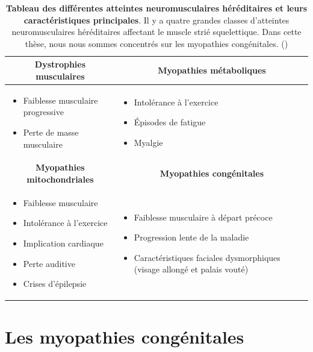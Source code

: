 \begin{table}[htbp]
\centering
\begin{tabularx}{\textwidth}{|X|X|}
 \hline
\multicolumn{1}{|c|}{\textbf{Dystrophies musculaires}} & \multicolumn{1}{|c|}{\textbf{Myopathies métaboliques}} \\
\hline
\begin{itemize}
\item Faiblesse musculaire progressive
\item Perte de masse musculaire
\end{itemize} &
\begin{itemize}
\item Intolérance à l'exercice
\item Épisodes de fatigue
\item Myalgie
\end{itemize} \\
\hline
\multicolumn{1}{|c|}{\textbf{Myopathies mitochondriales}} & \multicolumn{1}{|c|}{\textbf{Myopathies congénitales}} \\
\hline
\begin{itemize}
\item Faiblesse musculaire
\item Intolérance à l'exercice
\item Implication cardiaque
\item Perte auditive
\item Crises d'épilepsie
\end{itemize} &
\begin{itemize}
\item Faiblesse musculaire à départ précoce
\item Progression lente de la maladie
\item Caractéristiques faciales dysmorphiques (visage allongé et palais vouté)
\end{itemize} \\
\hline
\end{tabularx}
\caption[Tableau des différentes atteintes neuromusculaires et leurs caractéristiques principales]{\textbf{Tableau des différentes atteintes neuromusculaires héréditaires et leurs caractéristiques principales}. Il y a quatre grandes classes d'atteintes neuromusculaires héréditaires affectant le muscle strié squelettique. Dans cette thèse, nous nous sommes concentrés sur les myopathies congénitales. (\cite{lornage_identification_2019})}
\label{table:nmd}
\end{table}

\section{Les myopathies congénitales}
